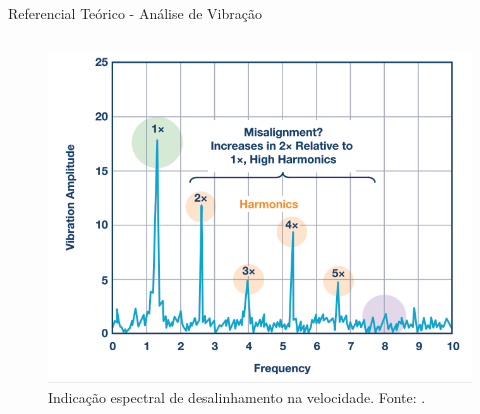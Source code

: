 \documentclass[aspectratio=169]{beamer}
\begin{document}

\begin{frame}{Referencial Teórico - Análise de Vibração}
	\begin{columns}
    	\begin{column}{0.50\textwidth}
			\begin{figure}[HT]
				\begin{center}
					\captionsetup{justification=justified}
					\includegraphics[scale=.25]{../referencial/img/misa_analog_p2.png}
					\caption{Indicação espectral de desalinhamento na velocidade. \newline
					Fonte: .} 
					\label{fig:misa_analog_p2}
				\end{center}
			\end{figure}
     	\end{column}
		

\end{columns}
\end{frame}
\end{document}
